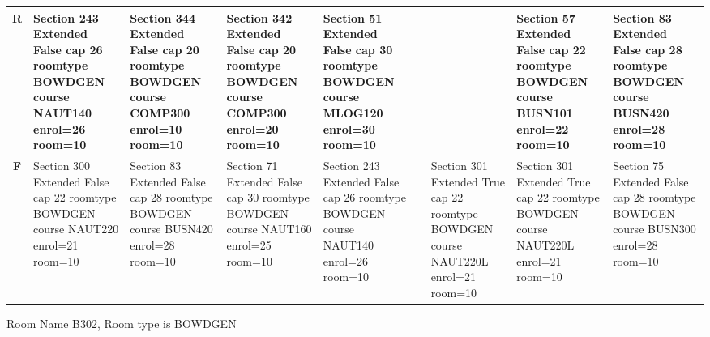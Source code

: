 \documentclass{article} \usepackage[margin=0.5in]{geometry}
\newcommand{\textgr}[1]{\cellcolor{gray!40}\textbf{#1}}
\begin{document}
\begin{tabular}{|c|z|z|z|z|z|z|z|z|}
\hline
\textgr{R} &  Section 243 Extended False cap 26 roomtype BOWDGEN course NAUT140 enrol=26 room=10   & Section 344 Extended False cap 20 roomtype BOWDGEN course COMP300 enrol=10 room=10 & Section 342 Extended False cap 20 roomtype BOWDGEN course COMP300 enrol=20 room=10 & Section 51 Extended False cap 30 roomtype BOWDGEN course MLOG120 enrol=30 room=10 &  &  & Section 57 Extended False cap 22 roomtype BOWDGEN course BUSN101 enrol=22 room=10 & Section 83 Extended False cap 28 roomtype BOWDGEN course BUSN420 enrol=28 room=10 \\[65pt]
\hline
\textgr{F} &  Section 300 Extended False cap 22 roomtype BOWDGEN course NAUT220 enrol=21 room=10 & Section 83 Extended False cap 28 roomtype BOWDGEN course BUSN420 enrol=28 room=10 & Section 71 Extended False cap 30 roomtype BOWDGEN course NAUT160 enrol=25 room=10 & Section 243 Extended False cap 26 roomtype BOWDGEN course NAUT140 enrol=26 room=10 &  & Section 301 Extended True cap 22 roomtype BOWDGEN course NAUT220L enrol=21 room=10 & Section 301 Extended True cap 22 roomtype BOWDGEN course NAUT220L enrol=21 room=10 & Section 75 Extended False cap 28 roomtype BOWDGEN course BUSN300 enrol=28 room=10 \\[65pt]
\hline
\end{tabular}

	
Room Name B302, Room type is BOWDGEN 
\newpage
	
\end{document}
